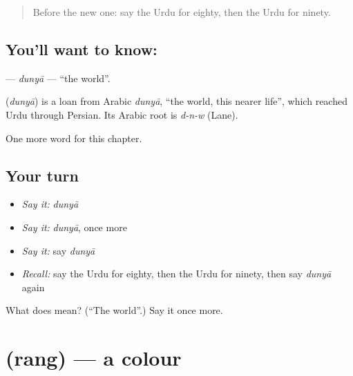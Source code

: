 \label{lesson:UR-C86-dunya}



\begin{quote}
Before the new one: say the Urdu for eighty, then the Urdu for ninety.
\end{quote}

\subsection*{You'll want to know: }
\textbf{} — \emph{dunyā} — \textquotedblleft{}the world\textquotedblright{}.

\begin{cousinweb}
\textbf{} (\emph{dunyā}) is a loan from Arabic \emph{dunyā}, \textquotedblleft{}the world, this nearer life\textquotedblright{}, which reached Urdu through Persian. Its Arabic root is \emph{d-n-w} (Lane).
\end{cousinweb}

\begin{grammarlens}[title={What you've built}]
One more word for this chapter.
\end{grammarlens}

\subsection*{Your turn}
\begin{itemize}
\raggedright
  \item \emph{Say it:} \emph{dunyā}
  \item \emph{Say it:} \emph{dunyā}, once more
  \item \emph{Say it:} say \emph{dunyā}
  \item \emph{Recall:} say the Urdu for eighty, then the Urdu for ninety, then say \emph{dunyā} again
\end{itemize}

\begin{tcolorbox}[breakable,colback=teal!4,colframe=teal!35!black,title={Before you move on}]
What does  mean? (\textquotedblleft{}The world\textquotedblright{}.) Say it once more.
\end{tcolorbox}
\section[\texorpdfstring{\ur{رنگ} (rang)}{رنگ (rang)}]{ (rang) — a colour}

\label{lesson:UR-C86-rang}



